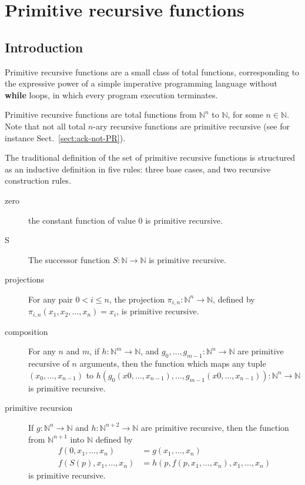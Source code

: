 \chapter{Primitive recursive functions}
\label{chapter:primrec}

\section{Introduction}
Primitive recursive functions are a small class of total functions, corresponding to the expressive power of a simple imperative programming language without \textbf{while} loops, in which every program execution terminates.

Primitive recursive functions are total functions from $\mathbb{N}^n$ to
$\mathbb{N}$, for some $n\in\mathbb{N}$. Note that not all 
total $n$-ary recursive functions are primitive recursive
(see for instance Sect.~\vref{sect:ack-not-PR}).

The traditional definition of the set of primitive recursive functions is structured as an inductive definition 
in five rules: three base cases, and two recursive construction rules. 

\begin{description}
  \item[zero] the constant function of value $0$ is primitive recursive.
\item[S] The successor function $S:\mathbb{N}\rightarrow\mathbb{N}$ is primitive recursive.
 \item[projections] For any pair $0< i\leq n$, the projection $\pi_{i,n}: \mathbb{N}^n\rightarrow\mathbb{N}$, defined by $\pi_{i,n}(x_1,x_2,\dots,x_{n})=x_i$, is primitive recursive.
\item[composition] For any $n$ and $m$, if $h: \mathbb{N}^m\rightarrow\mathbb{N}$, and
$g_0,\dots, g_{m-1}: \mathbb{N}^n\rightarrow\mathbb{N}$ are primitive recursive of $n$ arguments, then the function which maps any
tuple $(x_0,\dots,x_{n-1})$ to $h(g_0(x0,\dots,x_{n-1}),\dots, g_{m-1}(x0,\dots,x_{n-1})): \mathbb{N}^n\rightarrow\mathbb{N}$ is primitive recursive.
\item[primitive recursion]
If $g: \mathbb{N}^n\rightarrow\mathbb{N}$ and $h: \mathbb{N}^{n+2}\rightarrow\mathbb{N}$ are primitive recursive, then the function from $\mathbb{N}^{n+1}$ into $\mathbb{N}$ defined by
\begin{align}
f(0,x_1,\dots,x_n)&=g(x_1,\dots,x_n)\\
f(S(p),x_1,\dots,x_n)&=h(p,f(p, x_1,\dots,x_n),  x_1,\dots,x_n)
\end{align} 
is primitive recursive.
\end{description}



